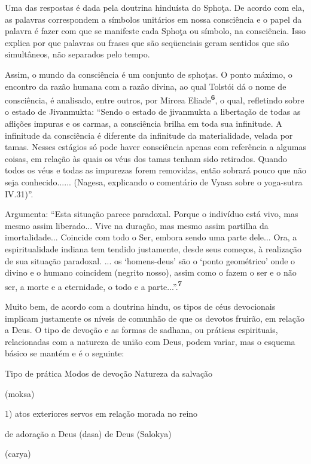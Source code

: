 Uma das respostas é dada pela doutrina hinduísta do Sphoţa. De acordo
com ela, as palavras correspondem a símbolos unitários em nossa
consciência e o papel da palavra é fazer com que se manifeste cada
Sphoţa ou símbolo, na consciência. Isso explica por que palavras ou
frases que são seqüenciais geram sentidos que são simultâneos, não
separados pelo tempo.

Assim, o mundo da consciência é um conjunto de sphoţas. O ponto máximo,
o encontro da razão humana com a razão divina, ao qual Tolstói dá o nome
de consciência, é analisado, entre outros, por Mircea
Eliade\textbf{\textsuperscript{6}}, o qual, refletindo sobre o estado de
Jivanmukta: ``Sendo o estado de jivanmukta a libertação de todas as
aflições impuras e os carmas, a consciência brilha em toda sua
infinitude. A infinitude da consciência é diferente da infinitude da
materialidade, velada por tamas. Nesses estágios só pode haver
consciência apenas com referência a algumas coisas, em relação às quais
os véus dos tamas tenham sido retirados. Quando todos os véus e todas as
impurezas forem removidas, então sobrará pouco que não seja
conhecido...... (Nagesa, explicando o comentário de Vyasa sobre o
yoga-sutra IV.31)''.

Argumenta: ``Esta situação parece paradoxal. Porque o indivíduo está
vivo, mas mesmo assim liberado... Vive na duração, mas mesmo assim
partilha da imortalidade... Coincide com todo o Ser, embora sendo uma
parte dele... Ora, a espiritualidade indiana tem tendido justamente,
desde seus começos, à realização de sua situação paradoxal. ... os
`homens-deus' são o `ponto geométrico' onde o divino e o humano
coincidem (negrito nosso), assim como o fazem o ser e o não ser, a morte
e a eternidade, o todo e a parte...''.\textbf{\textsuperscript{7}}

Muito bem, de acordo com a doutrina hindu, os tipos de céus devocionais
implicam justamente os níveis de comunhão de que os devotos fruirão, em
relação a Deus. O tipo de devoção e as formas de sadhana, ou práticas
espirituais, relacionadas com a natureza de união com Deus, podem
variar, mas o esquema básico se mantém e é o seguinte:

Tipo de prática Modos de devoção Natureza da salvação

(moksa)

1) atos exteriores servos em relação morada no reino

de adoração a Deus (dasa) de Deus (Salokya)

(carya)

